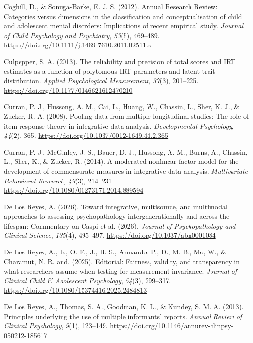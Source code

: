\documentclass[
  american,
  letterpaper,
  12pt]{article}
\newlength{\cslhangindent}
\newenvironment{CSLReferences}[2] %
 {\begin{list}{}{%
  \setlength{\itemindent}{0pt}
  \setlength{\leftmargin}{0pt}
  \setlength{\parsep}{0pt}
  \ifodd #1
   \setlength{\leftmargin}{\cslhangindent}
   \setlength{\itemindent}{-1\cslhangindent}
  \fi
  \setlength{\itemsep}{#2\baselineskip}}}
 {\end{list}}
\begin{document}
\begin{CSLReferences}{1}{0}
Coghill, D., \& Sonuga-Barke, E. J. S. (2012). {Annual Research Review}:
{Categories} versus dimensions in the classification and
conceptualisation of child and adolescent mental disorders: Implications
of recent empirical study. \emph{Journal of Child Psychology and
Psychiatry}, \emph{53}(5), 469--489.
\url{https://doi.org/10.1111/j.1469-7610.2011.02511.x}

Culpepper, S. A. (2013). The reliability and precision of total scores
and {IRT} estimates as a function of polytomous {IRT} parameters and
latent trait distribution. \emph{Applied Psychological Measurement},
\emph{37}(3), 201--225. \url{https://doi.org/10.1177/0146621612470210}

Curran, P. J., Hussong, A. M., Cai, L., Huang, W., Chassin, L., Sher, K.
J., \& Zucker, R. A. (2008). Pooling data from multiple longitudinal
studies: {The} role of item response theory in integrative data
analysis. \emph{Developmental Psychology}, \emph{44}(2), 365.
\url{https://doi.org/10.1037/0012-1649.44.2.365}

Curran, P. J., McGinley, J. S., Bauer, D. J., Hussong, A. M., Burns, A.,
Chassin, L., Sher, K., \& Zucker, R. (2014). A moderated nonlinear
factor model for the development of commensurate measures in integrative
data analysis. \emph{Multivariate Behavioral Research}, \emph{49}(3),
214--231. \url{https://doi.org/10.1080/00273171.2014.889594}

De Los Reyes, A. (2026). Toward integrative, multisource, and multimodal
approaches to assessing psychopathology intergenerationally and across
the lifespan: {Commentary} on {Caspi} et al. (2026). \emph{Journal of
Psychopathology and Clinical Science}, \emph{135}(4), 495--497.
\url{https://doi.org/10.1037/abn0001084}

De Los Reyes, A., L., O. F., J., R. S., Armando, P., D., M. B., Mo, W.,
\& Charamut, N. R. and. (2025). Editorial: {Fairness}, validity, and
transparency in what researchers assume when testing for measurement
invariance. \emph{Journal of Clinical Child \& Adolescent Psychology},
\emph{54}(3), 299--317.
\url{https://doi.org/10.1080/15374416.2025.2484813}

De Los Reyes, A., Thomas, S. A., Goodman, K. L., \& Kundey, S. M. A.
(2013). Principles underlying the use of multiple informants' reports.
\emph{Annual Review of Clinical Psychology}, \emph{9}(1), 123--149.
\url{https://doi.org/10.1146/annurev-clinpsy-050212-185617}


\end{CSLReferences}
\end{document}
